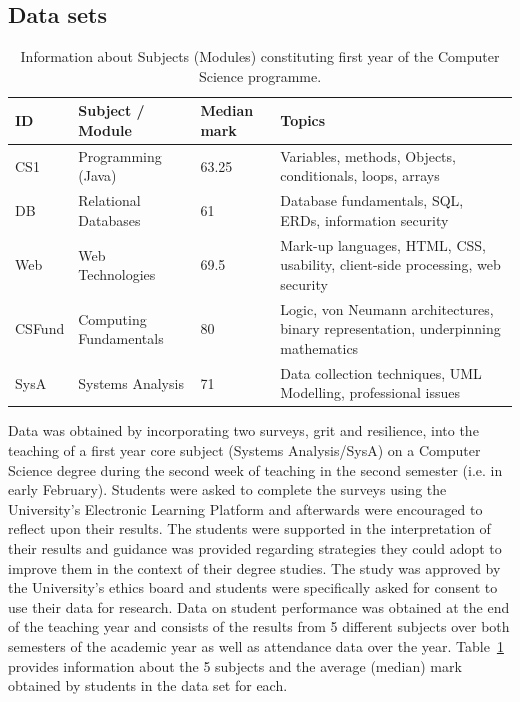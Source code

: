 \documentclass[sigconf]{acmart}
\begin{document}
\subsection {Data sets}
\begin{table}[ht]
\caption{Information about Subjects (Modules) constituting first year of the Computer Science programme.}
\begin{tabular}{llll}
\hline
\textbf{ID} & \textbf{Subject / Module} & \textbf{Median mark} & \textbf{Topics} \\
\hline
CS1  & Programming (Java)         & 63.25        & Variables, methods, Objects, conditionals, loops, arrays          \\
DB  & Relational Databases       & 61        & Database fundamentals, SQL, ERDs, information security          \\
Web  & Web Technologies         & 69.5      & Mark-up languages, HTML, CSS, usability, client-side processing, web security          \\
CSFund  & Computing Fundamentals & 80        & Logic, von Neumann architectures, binary representation, underpinning mathematics          \\
SysA  & Systems Analysis        & 71        & Data collection techniques, UML Modelling, professional issues                 
\end{tabular}
\label{tab:module_info}
\end{table}

 
Data was obtained by incorporating two surveys, grit and resilience, into the teaching of a first year core subject (Systems Analysis/SysA) on a Computer Science degree during the second week of teaching in the second semester (i.e. in early February). Students were asked to complete the surveys using the University's Electronic Learning Platform and afterwards were encouraged to reflect upon their results. The students were supported in the interpretation of their results and guidance was provided regarding strategies they could adopt to improve them in the context of their degree studies. The study was approved by the University's ethics board and students were specifically asked for consent to use their data for research. Data on student performance was obtained at the end of the teaching year and consists of the results from 5 different subjects over both semesters of the academic year as well as attendance data over the year. Table~\ref{tab:module_info} provides information about the 5 subjects and the average (median) mark obtained by students in the data set for each.
\end{document}
